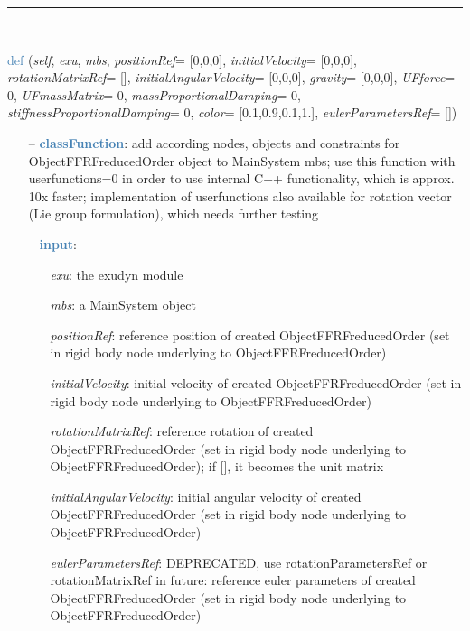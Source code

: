 \begin{itemize}[leftmargin=1.4cm]
\begin{itemize}[leftmargin=1.4cm]
\begin{itemize}[leftmargin=0.5cm]
\begin{itemize}[leftmargin=1.4cm]
\begin{itemize}[leftmargin=1.4cm]
\begin{itemize}[leftmargin=0.5cm]
%
\noindent\rule{8cm}{0.75pt}\vspace{1pt} \\ 
\begin{flushleft}
\noindent \textcolor{steelblue}{def {\bf {}}}\label{sec:FEM:ObjectFFRFreducedOrderInterface:AddObjectFFRFreducedOrderWithUserFunctions}
({\it self}, {\it exu}, {\it mbs}, {\it positionRef}= [0,0,0], {\it initialVelocity}= [0,0,0], {\it rotationMatrixRef}= [], {\it initialAngularVelocity}= [0,0,0], {\it gravity}= [0,0,0], {\it UFforce}= 0, {\it UFmassMatrix}= 0, {\it massProportionalDamping}= 0, {\it stiffnessProportionalDamping}= 0, {\it color}= [0.1,0.9,0.1,1.], {\it eulerParametersRef}= [])
\end{flushleft}
\setlength{\itemindent}{0.7cm}
\begin{itemize}[leftmargin=0.7cm]
\item[--]\textcolor{steelblue}{\bf classFunction}: add according nodes, objects and constraints for ObjectFFRFreducedOrder object to MainSystem mbs; use this function with userfunctions=0 in order to use internal C++ functionality, which is approx. 10x faster; implementation of userfunctions also available for rotation vector (Lie group formulation), which needs further testing
\item[--]\textcolor{steelblue}{\bf input}: \vspace{-6pt}
\begin{itemize}[leftmargin=1.2cm]
\setlength{\itemindent}{-0.7cm}
\item[]{\it exu}: the exudyn module
\item[]{\it mbs}: a MainSystem object
\item[]{\it positionRef}: reference position of created ObjectFFRFreducedOrder (set in rigid body node underlying to ObjectFFRFreducedOrder)
\item[]{\it initialVelocity}: initial velocity of created ObjectFFRFreducedOrder (set in rigid body node underlying to ObjectFFRFreducedOrder)
\item[]{\it rotationMatrixRef}: reference rotation of created ObjectFFRFreducedOrder (set in rigid body node underlying to ObjectFFRFreducedOrder); if [], it becomes the unit matrix
\item[]{\it initialAngularVelocity}: initial angular velocity of created ObjectFFRFreducedOrder (set in rigid body node underlying to ObjectFFRFreducedOrder)
\item[]{\it eulerParametersRef}: DEPRECATED, use rotationParametersRef or rotationMatrixRef in future: reference euler parameters of created ObjectFFRFreducedOrder (set in rigid body node underlying to ObjectFFRFreducedOrder)

\end{itemize}
\end{itemize}
\end{itemize}
\end{itemize}
\end{itemize}
\end{itemize}
\end{itemize}
\end{itemize}
